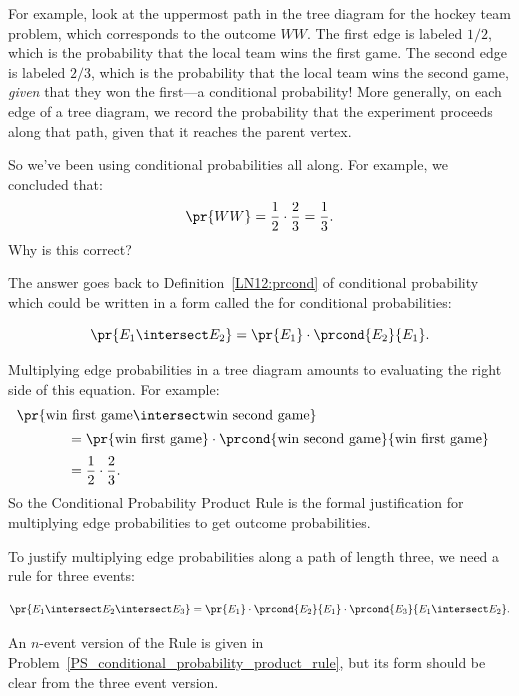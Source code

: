For example, look at the uppermost path in the tree diagram for the
hockey team problem, which corresponds to the outcome $WW$.  The first
edge is labeled $1/2$, which is the probability that the local team
wins the first game.  The second edge is labeled $2 / 3$, which is the
probability that the local team wins the second game, \emph{given}
that they won the first---a conditional probability!  More generally,
on each edge of a tree diagram, we record the probability that the
experiment proceeds along that path, given that it reaches the parent
vertex.

So we've been using conditional probabilities all along.  For
example, we concluded that:
%
\begin{equation*}
\pr{WW} = \frac{1}{2} \cdot \frac{2}{3}
	= \frac{1}{3}.
\end{equation*}
%
Why is this correct?

The answer goes back to Definition~\ref{LN12:prcond} of conditional probability
which could be written in a form called the  for
conditional probabilities:
%
\begin{rul*}
%
\[
    \pr{E_1 \intersect E_2} = \pr{E_1} \cdot \prcond{E_2}{E_1}.
\]
\end{rul*}
Multiplying edge probabilities in a tree diagram amounts to evaluating
the right side of this equation.  For example:
\begin{align*}
\lefteqn{\pr{\text{win first game} \intersect \text{win second game}}}
		\hspace{0.5in} \\[2pt]
	& = \pr{\text{win first game}} \cdot
            \prcond{\text{win second game}}{\text{win first game}} \\[2pt]
	& = \frac{1}{2} \cdot \frac{2}{3}.
\end{align*}
So the Conditional Probability Product Rule is the formal
justification for multiplying edge probabilities to get outcome
probabilities.

To justify multiplying edge probabilities along a path of length three, we need
a rule for three events:
\begin{rul*}
%
\[
    \pr{E_1 \intersect E_2 \intersect E_3} = \pr{E_1} \cdot
    \prcond{E_2}{E_1} \cdot
\prcond{E_3}{E_1 \intersect E_2}.
\]
\end{rul*}
An $n$-event version of the Rule is given in
Problem~\ref{PS_conditional_probability_product_rule}, but its form
should be clear from the three event version.

